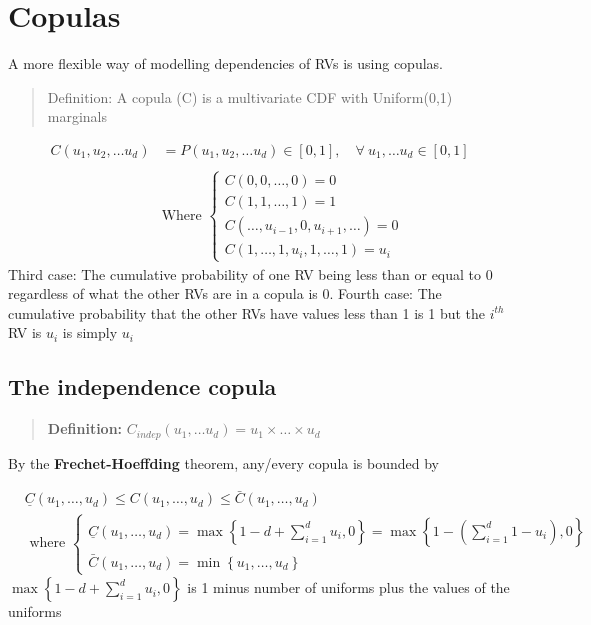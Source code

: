 \documentclass[
  oneside]{book}
\begin{document}
\hypertarget{copulas}{%
\chapter{Copulas}\label{copulas}}

A more flexible way of modelling dependencies of RVs is using copulas.

\begin{quote}
Definition: A copula (C) is a multivariate CDF with Uniform(0,1) marginals
\end{quote}

\[
\begin{aligned}
C(u_{1}, u_{2}, \dots u_{d}) &=P(u_{1}, u_{2}, \dots u_{d}) \in [0,1], \quad \forall \ u_{1},\dots u_{d} \in [0,1]\\ 
\\
&\text{Where }\begin{cases}
C(0,0, \ldots, 0)=0 \\
C(1,1, \ldots, 1)=1 \\
C\left(\ldots, u_{i-1}, 0, u_{i+1}, \ldots\right)=0 \\
C\left(1, \ldots, 1, u_i, 1, \ldots, 1\right)=u_i
\end{cases}
\end{aligned}
\]
Third case: The cumulative probability of one RV being less than or equal to 0 regardless of what the other RVs are in a copula is 0.
Fourth case: The cumulative probability that the other RVs have values less than 1 is 1 but the \(i^{th}\) RV is \(u_{i}\) is simply \(u_{i}\)

\hypertarget{the-independence-copula}{%
\section{The independence copula}\label{the-independence-copula}}

\begin{quote}
\textbf{Definition:} \(C_{indep} (u_{1}, \dots u_{d}) = u_{1} \times \dots \times u_{d}\)
\end{quote}

By the \textbf{Frechet-Hoeffding} theorem, any/every copula is bounded by

\[
\begin{aligned}
& \underline{C}\left(u_1, \ldots, u_d\right) \leq C\left(u_1, \ldots, u_d\right) \leq \bar{C}\left(u_1, \ldots, u_d\right) \\
& \text { where }
\begin{cases}
\underline{C}\left(u_1, \ldots, u_d\right)=\max \left\{1-d+\sum_{i=1}^d u_i, 0\right\} = \max\left\{ 1 - \left(\sum^d_{i=1} 1 - u_{i}\right),0 \right\} \\
\bar{C}\left(u_1, \ldots, u_d\right)=\min \left\{u_1, \ldots, u_d\right\}
\end{cases}
\end{aligned}
\]
\(\max \left\{1-d+\sum_{i=1}^d u_i, 0\right\}\) is 1 minus number of uniforms plus the values of the uniforms
\end{document}

